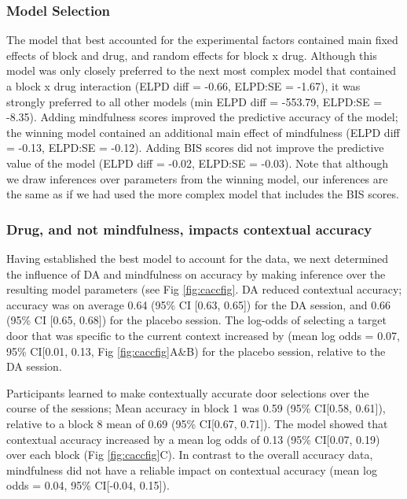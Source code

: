 \documentclass{article}
\begin{document}
\hypertarget{model-selection-1}{%
\subsubsection{Model Selection}\label{model-selection-1}}

The model that best accounted for the experimental factors contained
main fixed effects of block and drug, and random effects for block x
drug. Although this model was only closely preferred to the next most
complex model that contained a block x drug interaction (ELPD diff =
-0.66, ELPD:SE = -1.67), it was strongly preferred to all other models
(min ELPD diff = -553.79, ELPD:SE = -8.35). Adding mindfulness scores
improved the predictive accuracy of the model; the winning model
contained an additional main effect of mindfulness (ELPD diff = -0.13,
ELPD:SE = -0.12). Adding BIS scores did not improve the predictive value
of the model (ELPD diff = -0.02, ELPD:SE = -0.03). Note that although we
draw inferences over parameters from the winning model, our inferences
are the same as if we had used the more complex model that includes the
BIS scores.

\hypertarget{drug-and-not-mindfulness-impacts-contextual-accuracy}{%
\subsubsection{Drug, and not mindfulness, impacts contextual
accuracy}\label{drug-and-not-mindfulness-impacts-contextual-accuracy}}

Having established the best model to account for the data, we next
determined the influence of DA and mindfulness on accuracy by making
inference over the resulting model parameters (see Fig
\ref{fig:caccfig}. DA reduced contextual accuracy; accuracy was on
average 0.64 (95\% CI {[}0.63, 0.65{]}) for the DA session, and 0.66
(95\% CI {[}0.65, 0.68{]}) for the placebo session. The log-odds of
selecting a target door that was specific to the current context
increased by (mean log odds = 0.07, 95\% CI{[}0.01, 0.13, Fig
\ref{fig:caccfig}A\&B) for the placebo session, relative to the DA
session.

Participants learned to make contextually accurate door selections over
the course of the sessions; Mean accuracy in block 1 was 0.59 (95\%
CI{[}0.58, 0.61{]}), relative to a block 8 mean of 0.69 (95\% CI{[}0.67,
0.71{]}). The model showed that contextual accuracy increased by a mean
log odds of 0.13 (95\% CI{[}0.07, 0.19) over each block (Fig
\ref{fig:caccfig}C). In contrast to the overall accuracy data,
mindfulness did not have a reliable impact on contextual accuracy (mean
log odds = 0.04, 95\% CI{[}-0.04, 0.15{]}).
\end{document}

